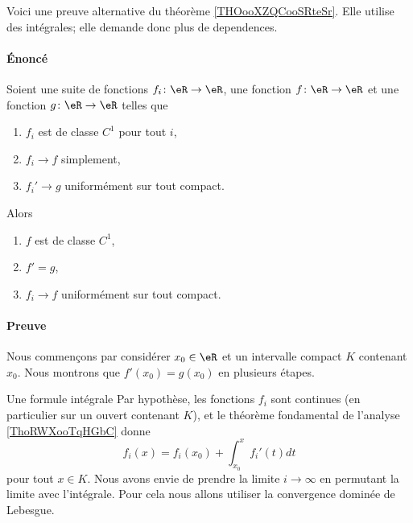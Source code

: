\begin{normaltext}      \label{NORMALooGYUEooKrYjyz}
	Voici une preuve alternative du théorème \ref{THOooXZQCooSRteSr}. Elle utilise des intégrales; elle demande donc plus de dependences.

	\paragraph{Énoncé}
	Soient une suite de fonctions \( f_i\colon \eR\to \eR\), une fonction \( f\colon \eR\to \eR\) et une fonction \( g\colon \eR\to \eR\) telles que
	\begin{enumerate}
		\item
		      \( f_i\) est de classe \( C^1\) pour tout \( i\),
		\item
		      \( f_i\to f\) simplement,
		\item
		      \( f_i'\to g\) uniformément sur tout compact.
	\end{enumerate}
	Alors
	\begin{enumerate}
		\item
		      \( f\) est de classe \( C^1\),
		\item
		      \( f'=g\),
		\item
		      \( f_i\to f\) uniformément sur tout compact.
	\end{enumerate}
	\paragraph{Preuve}

	Nous commençons par considérer \( x_0\in \eR\) et un intervalle compact \( K\) contenant \( x_0\). Nous montrons que \( f'(x_0)=g(x_0)\) en plusieurs étapes.
	\begin{subproof}
		\item[Une formule intégrale]
		Par hypothèse, les fonctions \( f_i\) sont continues (en particulier sur un ouvert contenant \( K\)), et le théorème fondamental de l'analyse \ref{ThoRWXooTqHGbC} donne
		\begin{equation}        \label{EQooFUBZooOVUhep}
			f_i(x)=f_i(x_0)+\int_{x_0}^xf_i'(t)dt
		\end{equation}
		pour tout \( x\in K\). Nous avons envie de prendre la limite \( i\to \infty\) en permutant la limite avec l'intégrale. Pour cela nous allons utiliser la convergence dominée de Lebesgue.


\end{subproof}
\end{normaltext}
